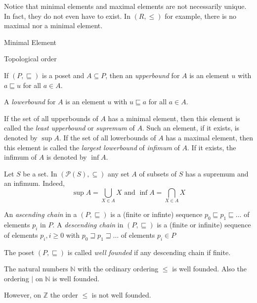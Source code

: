 \begin{example}
    Notice that minimal elements and maximal elements are not necessarily unique.
    In fact, they do not even have to exist. In $(R,\le)$ for example, there is
    no maximal nor a minimal element.
\end{example}

\begin{algorithm} [H]
    Minimal Element
\end{algorithm}

\begin{algorithm} [H]
    Topological order
\end{algorithm}

\begin{definition}
    If $ (P, \sqsubseteq) $ is a poset and $A \subseteq P$, then an \emph{upperbound}
    for $A$ is an element $u$ with $a \sqsubseteq u$ for all $a \in A$.

    A \emph{lowerbound} for $A$ is an element $u$ with $u \sqsubseteq a$ for all
    $a \in A$.

    If the set of all upperbounds of $A$ has a minimal element, then this element is
    called the \emph{least upperbound} or \emph{supremum} of $A$. Such an element,
    if it exists, is denoted by $ \sup A $. If the set of all lowerbounds of
    $A$ has a maximal element, then this element is called the \emph{largest lowerbound}
    of \emph{infimum} of $A$. If it exists, the infimum of $A$ is denoted by $\inf A$.
\end{definition}

\begin{example}
    Let $S$ be a set. In $ (\mathcal{P}(S), \subseteq) $ any set $A$ of subsets of
    $S$ has a supremum and an infimum. Indeed,
    $$ \sup A = \bigcup_{X \in A}X \text{ and } \inf A = \bigcap_{X \in A}X $$
\end{example}

\begin{definition}
    An \emph{ascending chain} in a $ (P, \sqsubseteq) $ is a (finite or infinte)
    sequence $ p_0 \sqsubseteq p_1 \sqsubseteq \dots $ of elements $p_i$ in $P$. A
    \emph{descending chain} in $ (P, \sqsubseteq) $ is a (finite or infinite)
    sequence of elements $p_i, i \ge 0$ with $ p_0 \sqsupseteq p_1 \sqsupseteq \dots $
    of elements $p_i \in P$

    The poset $ (P, \sqsubseteq) $ is called \emph{well founded} if any descending
    chain if finite.
\end{definition}

\begin{example}
    The natural numbers $\mathbb{N}$ with the ordinary ordering $\le$ is well
    founded. Also the ordering $\mid$ on $\mathbb{N}$ is well founded.

    However, on $\mathbb{Z}$ the order $\le$ is not well founded.
\end{example}